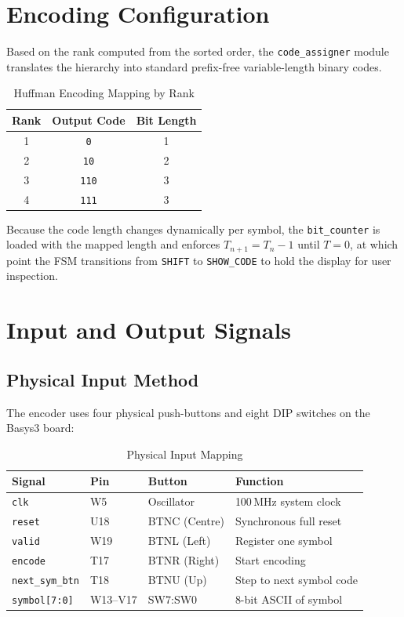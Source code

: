 \documentclass[12pt,a4paper]{article}
\begin{document}
\section{Encoding Configuration}

Based on the rank computed from the sorted order, the \texttt{code\_assigner}
module translates the hierarchy into standard prefix-free variable-length binary codes.

\begin{table}[H]
\centering
\caption{Huffman Encoding Mapping by Rank}
\begin{tabular}{ccc}
\toprule
\textbf{Rank} & \textbf{Output Code} & \textbf{Bit Length} \\
\midrule
1 & \texttt{0}   & 1 \\
2 & \texttt{10}  & 2 \\
3 & \texttt{110} & 3 \\
4 & \texttt{111} & 3 \\
\bottomrule
\end{tabular}
\end{table}

Because the code length changes dynamically per symbol, the \texttt{bit\_counter} is
loaded with the mapped length and enforces $T_{n+1} = T_n - 1$ until $T = 0$, at which
point the FSM transitions from \texttt{SHIFT} to \texttt{SHOW\_CODE} to hold the
display for user inspection.

\section{Input and Output Signals}

\subsection{Physical Input Method}
The encoder uses four physical push-buttons and eight DIP switches on the Basys3 board:

\begin{table}[H]
\centering
\caption{Physical Input Mapping}
\begin{tabular}{llll}
\toprule
\textbf{Signal} & \textbf{Pin} & \textbf{Button} & \textbf{Function} \\
\midrule
\texttt{clk}          & W5  & Oscillator & 100\,MHz system clock \\
\texttt{reset}        & U18 & BTNC (Centre) & Synchronous full reset \\
\texttt{valid}        & W19 & BTNL (Left)   & Register one symbol \\
\texttt{encode}       & T17 & BTNR (Right)  & Start encoding \\
\texttt{next\_sym\_btn}& T18 & BTNU (Up)    & Step to next symbol code \\
\texttt{symbol[7:0]}  & W13--V17 & SW7:SW0 & 8-bit ASCII of symbol \\
\bottomrule
\end{tabular}
\end{table}
\end{document}
